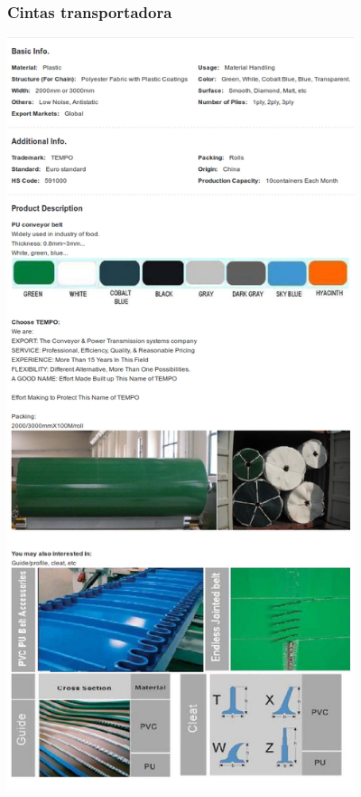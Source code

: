 \subsubsection{Cintas transportadora}
\includegraphics[height=22cm,keepaspectratio]{Datasheets/11Cinta.png} 
\newpage
